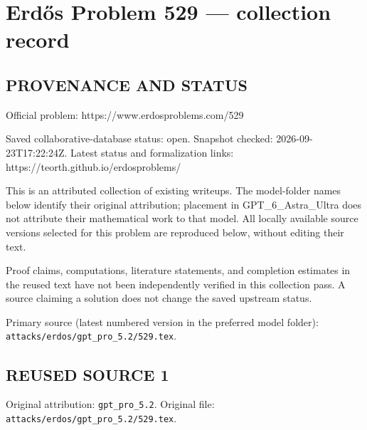 \section*{Erd\H{o}s Problem 529 --- collection record}

\subsection*{PROVENANCE AND STATUS}
Official problem: https://www.erdosproblems.com/529

Saved collaborative-database status: open.
Snapshot checked: 2026-09-23T17:22:24Z.
Latest status and formalization links: https://teorth.github.io/erdosproblems/

This is an attributed collection of existing writeups. The model-folder names below identify their original attribution; placement in GPT\_6\_Astra\_Ultra does not attribute their mathematical work to that model. All locally available source versions selected for this problem are reproduced below, without editing their text.

Proof claims, computations, literature statements, and completion estimates in the reused text have not been independently verified in this collection pass. A source claiming a solution does not change the saved upstream status.

Primary source (latest numbered version in the preferred model folder): \texttt{attacks/erdos/gpt\_pro\_5.2/529.tex}.

\subsection*{REUSED SOURCE 1}
Original attribution: \texttt{gpt\_pro\_5.2}.
Original file: \texttt{attacks/erdos/gpt\_pro\_5.2/529.tex}.


